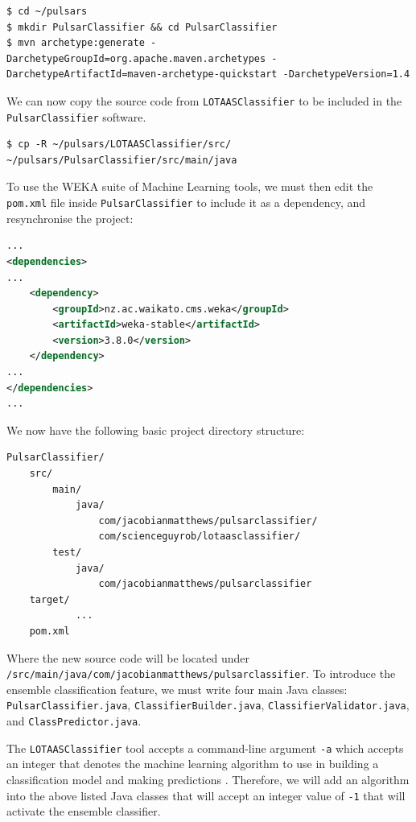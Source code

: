 \documentclass{article}
\begin{document}
\begin{appendices}
\begin{subappendices}
\begin{lstlisting}[numbers=none]
$ cd ~/pulsars
$ mkdir PulsarClassifier && cd PulsarClassifier
$ mvn archetype:generate -DarchetypeGroupId=org.apache.maven.archetypes -DarchetypeArtifactId=maven-archetype-quickstart -DarchetypeVersion=1.4
\end{lstlisting}

We can now copy the source code from \verb|LOTAASClassifier| to be included in the \verb|PulsarClassifier| software.

\begin{lstlisting}[numbers=none]
$ cp -R ~/pulsars/LOTAASClassifier/src/ ~/pulsars/PulsarClassifier/src/main/java
\end{lstlisting}

To use the WEKA suite of Machine Learning tools, we must then edit the \verb|pom.xml| file inside \verb|PulsarClassifier| to include it as a dependency, and resynchronise the project:\\

\begin{lstlisting}[numbers=none, title=pom.xml, language=xml]
...
<dependencies>
...
    <dependency>
        <groupId>nz.ac.waikato.cms.weka</groupId>
        <artifactId>weka-stable</artifactId>
        <version>3.8.0</version>
    </dependency>
...
</dependencies>
...
\end{lstlisting}

We now have the following basic project directory structure:

\begin{lstlisting}[numbers=none]
PulsarClassifier/
    src/
        main/
            java/
                com/jacobianmatthews/pulsarclassifier/
                com/scienceguyrob/lotaasclassifier/
        test/
            java/
                com/jacobianmatthews/pulsarclassifier
    target/
            ...
    pom.xml
\end{lstlisting}

Where the new source code will be located under \\\verb|/src/main/java/com/jacobianmatthews/pulsarclassifier|. To introduce the ensemble classification feature, we must write four main Java classes: \\\verb|PulsarClassifier.java|,  \verb|ClassifierBuilder.java|,  \verb|ClassifierValidator.java|,  and \verb|ClassPredictor.java|.

The \verb|LOTAASClassifier| tool accepts a command-line argument \verb|-a| which accepts an integer that denotes the machine learning algorithm to use in building a classification model and making predictions \autocite{lyon}. Therefore, we will add an algorithm into the above listed Java classes that will accept an integer value of \verb|-1| that will activate the ensemble classifier.


\end{subappendices}
\end{appendices}
\end{document}
